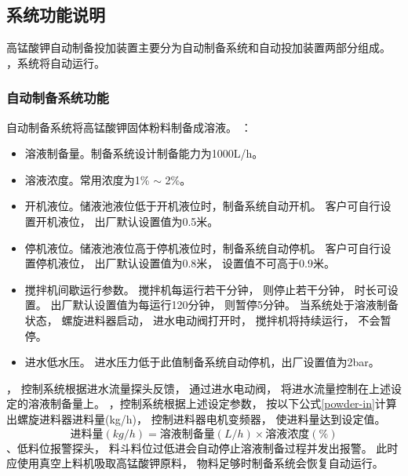 \documentclass[UTF8,a4paper,12pt,titlepage]{ctexart}
\begin{document}
   \subsection{系统功能说明}
      高锰酸钾自动制备投加装置主要分为自动制备系统和自动投加装置两部分组成。
      ，系统将自动运行。
      \subsubsection{自动制备系统功能}
         自动制备系统将高锰酸钾固体粉料制备成溶液。
         ：
         \begin{itemize}
            \item 溶液制备量。制备系统设计制备能力为1000L/h。
            \item 溶液浓度。常用浓度为1\% $\sim$ 2\%。
            \item 开机液位。储液池液位低于开机液位时，制备系统自动开机。
               客户可自行设置开机液位，
               出厂默认设置值为0.5米。
            \item 停机液位。储液池液位高于停机液位时，制备系统自动停机。
               客户可自行设置停机液位，
               出厂默认设置值为0.8米，
               设置值不可高于0.9米。
            \item 搅拌机间歇运行参数。
            搅拌机每运行若干分钟，
            则停止若干分钟，
            时长可设置。
            出厂默认设置值为每运行120分钟，
            则暂停5分钟。
            当系统处于溶液制备状态，
            螺旋进料器启动，
            进水电动阀打开时，
            搅拌机将持续运行，
            不会暂停。
            \item 进水低水压。
            进水压力低于此值制备系统自动停机，出厂设置值为2bar。
         \end{itemize}
         ，
         控制系统根据进水流量探头反馈，
         通过进水电动阀，
         将进水流量控制在上述设定的溶液制备量上。
         ，控制系统根据上述设定参数，
         按以下公式\ref{powder-in}计算出螺旋进料器进料量(kg/h)，
         控制进料器电机变频器，
         使进料量达到设定值。
         \begin{equation}
            \label{powder-in}
            \mbox{进料量}(kg/h) = \mbox{溶液制备量}(L/h)  \times \mbox{溶液浓度} (\%)
         \end{equation}
         、低料位报警探头，
         料斗料位过低进会自动停止溶液制备过程并发出报警。
         此时应使用真空上料机吸取高锰酸钾原料，
         物料足够时制备系统会恢复自动运行。
\end{document}
